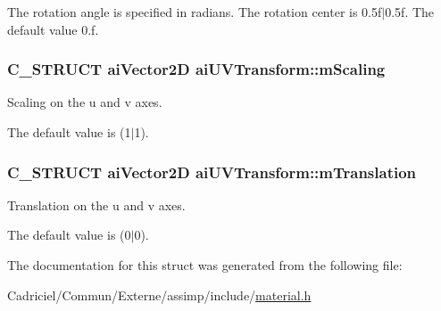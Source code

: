 The rotation angle is specified in radians. The rotation center is 0.\+5f$\vert$0.5f. The default value 0.\+f. 
\subsubsection[{\texorpdfstring{m\+Scaling}{mScaling}}]{\setlength{\rightskip}{0pt plus 5cm}C\+\_\+\+S\+T\+R\+U\+CT {\bf ai\+Vector2D} ai\+U\+V\+Transform\+::m\+Scaling}\hypertarget{structai_u_v_transform_a89429a027cbf914e7212e48149a957c8}{}\label{structai_u_v_transform_a89429a027cbf914e7212e48149a957c8}
Scaling on the u and v axes.

The default value is (1$\vert$1). 
\subsubsection[{\texorpdfstring{m\+Translation}{mTranslation}}]{\setlength{\rightskip}{0pt plus 5cm}C\+\_\+\+S\+T\+R\+U\+CT {\bf ai\+Vector2D} ai\+U\+V\+Transform\+::m\+Translation}\hypertarget{structai_u_v_transform_a8c7f35959aa342bf0cef670246fbb813}{}\label{structai_u_v_transform_a8c7f35959aa342bf0cef670246fbb813}
Translation on the u and v axes.

The default value is (0$\vert$0). 

The documentation for this struct was generated from the following file\+:\begin{DoxyCompactItemize}
\item 
Cadriciel/\+Commun/\+Externe/assimp/include/\hyperlink{material_8h}{material.\+h}\end{DoxyCompactItemize}
